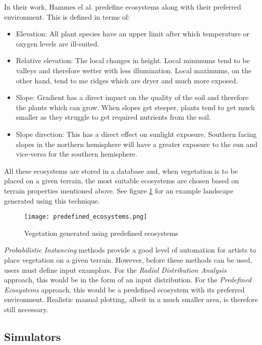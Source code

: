 In their work, Hammes el al. \cite{Hammes2001} predefine ecosystems along with their preferred environment. This is defined in terms of:

\begin{itemize}
\item Elevation: All plant species have an upper limit after which temperature or oxygen levels are ill-suited.
\item Relative elevation: The local changes in height. Local minimums tend to be valleys and therefore wetter with less illumination. Local maximums, on the other hand, tend to me ridges which are dryer and much more exposed.
\item Slope: Gradient has a direct impact on the quality of the soil and therefore the plants which can grow. When slopes get steeper, plants tend to get much smaller as they struggle to get required nutrients from the soil.
\item Slope direction: This has a direct effect on sunlight exposure. Southern facing slopes in the northern hemisphere will have a greater exposure to the sun and vice-versa for the southern hemisphere.  
\end{itemize}

All these ecosystems are stored in a database and, when vegetation is to be placed on a given terrain, the most suitable ecosystems are chosen based on terrain properties mentioned above. See figure \ref{Vegetation generated using predefined ecosystems} for an example landscape generated using this technique.

\begin{figure}[h]
  \centering
	\label{Vegetation generated using predefined ecosystems}
	\texttt{[image: predefined\_ecosystems.png]}
	\caption{Vegetation generated using predefined ecosystems \cite{Hammes2001}}
\end{figure}

\textit{Probabilistic Instancing} methods provide a good level of automation for artists to place vegetation on a given terrain. However, before these methods can be used, users must define input examplars. For the \textit{Radial Distribution Analysis} approach, this would be in the form of an input distribution. For the \textit{Predefined Ecosystems} approach, this would be a predefined ecosystem with its preferred environment. Realistic manual plotting, albeit in a much smaller area, is therefore still necessary.

\subsection{Simulators} \label{Simulators}

